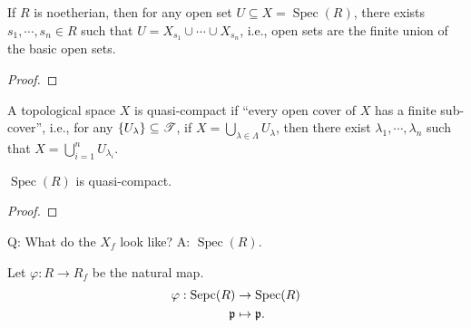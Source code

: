 \begin{proposition}
    If $R$ is noetherian, then for any open set $U \subseteq X = \operatorname{Spec}(R)$, there exists $s_1,\cdots,s_n \in R$ such that $U = X_{s_1} \cup \cdots \cup X_{s_n}$, i.e., open sets are the finite union of the basic open sets.
\end{proposition}

\begin{proof}

\end{proof}

\begin{definition}
    A topological space $X$ is quasi-compact if ``every open cover of $X$ has a finite sub-cover'', i.e., for any $\{U_\lambda\} \subseteq \mathscr{T}$, if $X = \bigcup_{\lambda \in \Lambda} U_\lambda$, then there exist $\lambda_1,\cdots,\lambda_n$ such that $X = \bigcup_{i=1}^n U_{\lambda_i}$.
\end{definition}

\begin{theorem}
    $\operatorname{Spec}(R)$ is quasi-compact.
\end{theorem}

\begin{proof}

\end{proof}

Q: What do the $X_f$ look like? A: $\operatorname{Spec}(R)$.

\begin{proposition}
    Let $\varphi: R \to R_f$ be the natural map.
    \begin{align*}
        \varphi: \operatorname{Sepc}(R) &\to \operatorname{Spec}(R) \\
        \mathfrak{p} &\mapsto \mathfrak{p}.
    \end{align*}
\end{proposition}


